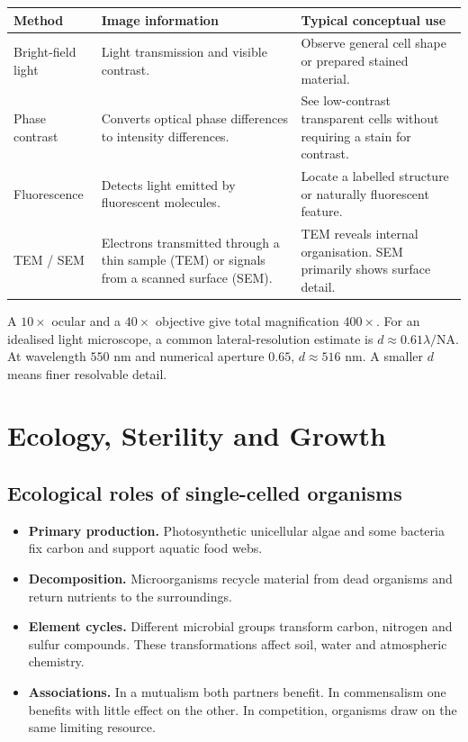 \documentclass[12pt,a4paper]{article}
\begin{document}
\par\vspace{5pt}
\begingroup
\setlength{\extrarowheight}{1pt}
\noindent\begin{tabularx}{\linewidth}{|B{3.5cm}|Y|Y|}
\hline
\textbf{Method} & \textbf{Image information} & \textbf{Typical conceptual use} \\ \hline
Bright-field light & Light transmission and visible contrast. & Observe general cell shape or prepared stained material. \\ \hline
Phase contrast & Converts optical phase differences to intensity differences. & See low-contrast transparent cells without requiring a stain for contrast. \\ \hline
Fluorescence & Detects light emitted by fluorescent molecules. & Locate a labelled structure or naturally fluorescent feature. \\ \hline
TEM / SEM & Electrons transmitted through a thin sample (TEM) or signals from a scanned surface (SEM). & TEM reveals internal organisation. SEM primarily shows surface detail. \\ \hline
\end{tabularx}\par
\endgroup
\begin{tcolorbox}[examplebox, title={Separate magnification from resolution}]
A $10\times$ ocular and a $40\times$ objective give total magnification $400\times$. For an idealised light microscope, a common lateral-resolution estimate is $d\approx0.61\lambda/\mathrm{NA}$. At wavelength $550$ nm and numerical aperture $0.65$, $d\approx516$ nm. A smaller $d$ means finer resolvable detail.
\end{tcolorbox}

\section{Ecology, Sterility and Growth}
\subsection{Ecological roles of single-celled organisms}
\begin{itemize}[leftmargin=*, itemsep=3pt, topsep=4pt]
  \item \textbf{Primary production.} Photosynthetic unicellular algae and some bacteria fix carbon and support aquatic food webs.
  \item \textbf{Decomposition.} Microorganisms recycle material from dead organisms and return nutrients to the surroundings.
  \item \textbf{Element cycles.} Different microbial groups transform carbon, nitrogen and sulfur compounds. These transformations affect soil, water and atmospheric chemistry.
  \item \textbf{Associations.} In a mutualism both partners benefit. In commensalism one benefits with little effect on the other. In competition, organisms draw on the same limiting resource.
\end{itemize}
\end{document}
